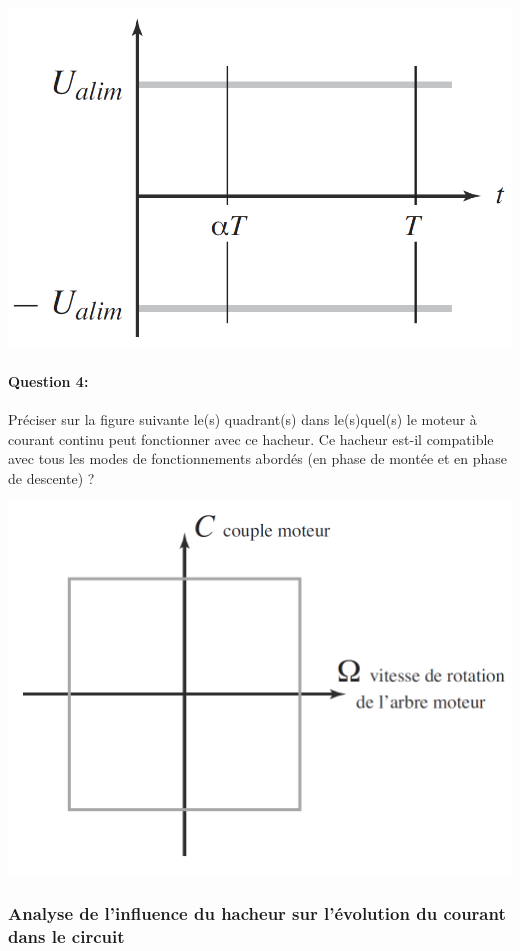 \begin{center}
 \includegraphics[width=0.8\linewidth]{img/td02_11}
\end{center}

\paragraph{Question 4:}

Préciser sur la figure suivante le(s) quadrant(s) dans le(s)quel(s) le moteur à courant continu peut fonctionner avec ce hacheur. Ce hacheur est-il compatible avec tous les modes de fonctionnements abordés (en phase de montée et en phase de descente) ?

\begin{center}
 \includegraphics[width=0.8\linewidth]{img/td02_12}
\end{center}


\subsubsection{Analyse de l'influence du hacheur sur l'évolution du courant dans le circuit}

